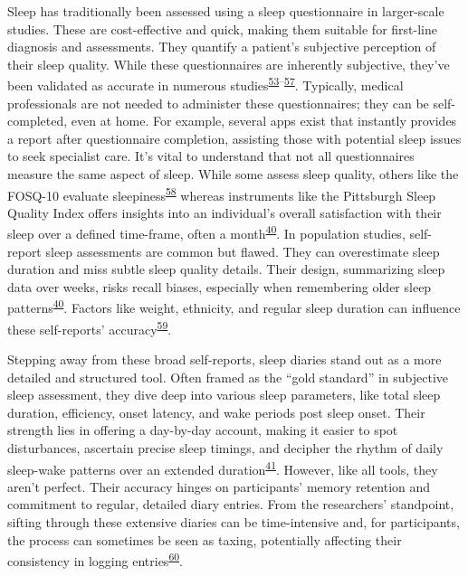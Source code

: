 \documentclass[
  10pt,
]{scrbook}
\begin{document}
Sleep has traditionally been assessed using a sleep questionnaire in
larger-scale studies. These are cost-effective and quick, making them
suitable for first-line diagnosis and assessments. They quantify a
patient's subjective perception of their sleep quality. While these
questionnaires are inherently subjective, they've been validated as
accurate in numerous
studies\textsuperscript{\protect\hyperlink{ref-silva_2011}{53}--\protect\hyperlink{ref-pataka_2014}{57}}.
Typically, medical professionals are not needed to administer these
questionnaires; they can be self-completed, even at home. For example,
several apps exist that instantly provides a report after questionnaire
completion, assisting those with potential sleep issues to seek
specialist care. It's vital to understand that not all questionnaires
measure the same aspect of sleep. While some assess sleep quality,
others like the FOSQ-10 evaluate
sleepiness\textsuperscript{\protect\hyperlink{ref-chasens_2009}{58}}
whereas instruments like the Pittsburgh Sleep Quality Index offers
insights into an individual's overall satisfaction with their sleep over
a defined time-frame, often a
month\textsuperscript{\protect\hyperlink{ref-sadeh_2015}{40}}. In
population studies, self-report sleep assessments are common but flawed.
They can overestimate sleep duration and miss subtle sleep quality
details. Their design, summarizing sleep data over weeks, risks recall
biases, especially when remembering older sleep
patterns\textsuperscript{\protect\hyperlink{ref-sadeh_2015}{40}}.
Factors like weight, ethnicity, and regular sleep duration can influence
these self-reports'
accuracy\textsuperscript{\protect\hyperlink{ref-lauderdale_2008}{59}}.

Stepping away from these broad self-reports, sleep diaries stand out as
a more detailed and structured tool. Often framed as the ``gold
standard'' in subjective sleep assessment, they dive deep into various
sleep parameters, like total sleep duration, efficiency, onset latency,
and wake periods post sleep onset. Their strength lies in offering a
day-by-day account, making it easier to spot disturbances, ascertain
precise sleep timings, and decipher the rhythm of daily sleep-wake
patterns over an extended
duration\textsuperscript{\protect\hyperlink{ref-ibuxe1uxf1ez_2018}{41}}.
However, like all tools, they aren't perfect. Their accuracy hinges on
participants' memory retention and commitment to regular, detailed diary
entries. From the researchers' standpoint, sifting through these
extensive diaries can be time-intensive and, for participants, the
process can sometimes be seen as taxing, potentially affecting their
consistency in logging
entries\textsuperscript{\protect\hyperlink{ref-thurman_2018}{60}}.
\end{document}
